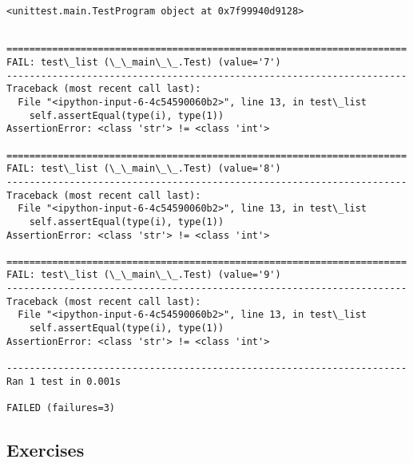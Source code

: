 \documentclass[11pt]{article}
\begin{document}
    \begin{Verbatim}[commandchars=\\\{\}]
<unittest.main.TestProgram object at 0x7f99940d9128>
    \end{Verbatim}

    \begin{Verbatim}[commandchars=\\\{\}]

======================================================================
FAIL: test\_list (\_\_main\_\_.Test) (value='7')
----------------------------------------------------------------------
Traceback (most recent call last):
  File "<ipython-input-6-4c54590060b2>", line 13, in test\_list
    self.assertEqual(type(i), type(1))
AssertionError: <class 'str'> != <class 'int'>

======================================================================
FAIL: test\_list (\_\_main\_\_.Test) (value='8')
----------------------------------------------------------------------
Traceback (most recent call last):
  File "<ipython-input-6-4c54590060b2>", line 13, in test\_list
    self.assertEqual(type(i), type(1))
AssertionError: <class 'str'> != <class 'int'>

======================================================================
FAIL: test\_list (\_\_main\_\_.Test) (value='9')
----------------------------------------------------------------------
Traceback (most recent call last):
  File "<ipython-input-6-4c54590060b2>", line 13, in test\_list
    self.assertEqual(type(i), type(1))
AssertionError: <class 'str'> != <class 'int'>

----------------------------------------------------------------------
Ran 1 test in 0.001s

FAILED (failures=3)
    \end{Verbatim}

    \hypertarget{exercises}{%
\subsection{Exercises}\label{exercises}}


    
    
    
\end{document}
